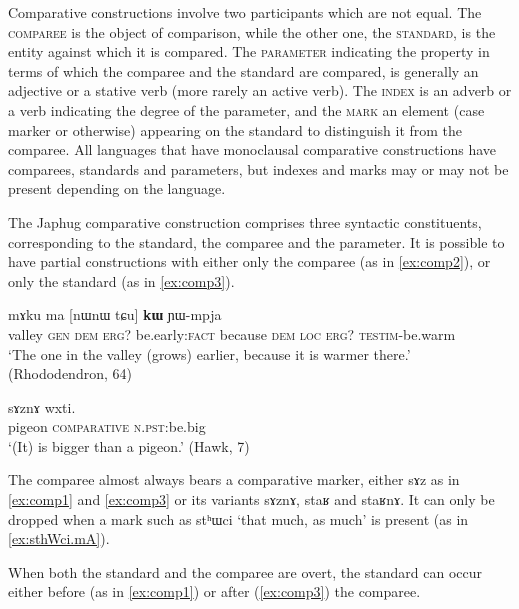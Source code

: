 \documentclass[oldfontcommands,oneside,a4paper,11pt]{article}
\newcommand{\ipa}[1]{{\phon #1}} %
\begin{document}
Comparative constructions involve two participants which are not equal. The \textsc{comparee} is  the object of comparison, while the other one, the \textsc{standard}, is the entity against which it is compared. The \textsc{parameter} indicating the property in terms of which the comparee and the standard are compared, is generally an adjective or a stative verb (more rarely an active verb). The \textsc{index} is an adverb or a verb indicating the degree of the parameter, and the \textsc{mark} an element (case marker or otherwise) appearing on the standard to distinguish it from the comparee. All languages that have monoclausal comparative constructions have comparees, standards and parameters, but indexes and marks may or may not be present depending on the language.

 

The Japhug comparative construction comprises three syntactic constituents, corresponding to the standard, the comparee and the parameter. It is possible to have partial constructions with either only the comparee  (as in \ref{ex:comp2}), or only the standard (as in \ref{ex:comp3}).

 \begin{exe}
\ex \label{ex:comp2}
\gll 
[\ipa{co}  	\ipa{ɣɯ}  	\ipa{nɯnɯ}]  	\ipa{\textbf{kɯ}}  	\ipa{mɤku}  	\ipa{ma}  	[\ipa{nɯnɯ} \ipa{tɕu}]  	\ipa{\textbf{kɯ}}  	\ipa{ɲɯ-mpja}  \\
valley \textsc{gen} \textsc{dem} \textsc{erg?} be.early:\textsc{fact} because \textsc{dem} \textsc{loc} \textsc{erg?} \textsc{testim}-be.warm \\
\glt `The one in the valley (grows) earlier, because it is warmer there.' (Rhododendron, 64)
\end{exe}

\begin{exe}
\ex \label{ex:comp3}
\gll  \ipa{qɤjdo}  	\ipa{sɤznɤ}  	\ipa{wxti.}     \\
pigeon \textsc{comparative} \textsc{n.pst:}be.big \\
\glt `(It) is bigger than a pigeon.' (Hawk, 7)
\end{exe}


The comparee almost always bears a comparative marker, either \ipa{sɤz} as in \ref{ex:comp1} and \ref{ex:comp3} or its variants \ipa{sɤznɤ}, \ipa{staʁ} and \ipa{staʁnɤ}. It can only be dropped when a mark such as \ipa{stʰɯci} `that much, as much' is present (as in \ref{ex:sthWci.mA}).
 
 When both the standard and the comparee are overt, the standard can occur either before (as in  \ref{ex:comp1}) or after (\ref{ex:comp3}) the comparee.  
 
\end{document}
